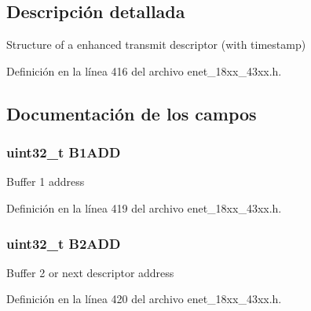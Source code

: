\subsection{Descripción detallada}
Structure of a enhanced transmit descriptor (with timestamp) 

Definición en la línea 416 del archivo enet\+\_\+18xx\+\_\+43xx.\+h.



\subsection{Documentación de los campos}
\subsubsection[{\texorpdfstring{B1\+A\+DD}{B1ADD}}]{ uint32\+\_\+t B1\+A\+DD}\hypertarget{struct_e_n_e_t___e_n_h_t_x_d_e_s_c___t_a9b99a80d13d854bce5c3f9646964c34e}{}\label{struct_e_n_e_t___e_n_h_t_x_d_e_s_c___t_a9b99a80d13d854bce5c3f9646964c34e}
Buffer 1 address 

Definición en la línea 419 del archivo enet\+\_\+18xx\+\_\+43xx.\+h.

\subsubsection[{\texorpdfstring{B2\+A\+DD}{B2ADD}}]{ uint32\+\_\+t B2\+A\+DD}\hypertarget{struct_e_n_e_t___e_n_h_t_x_d_e_s_c___t_a3cf5d995cea5c3b42b9224871c5b18a1}{}\label{struct_e_n_e_t___e_n_h_t_x_d_e_s_c___t_a3cf5d995cea5c3b42b9224871c5b18a1}
Buffer 2 or next descriptor address 

Definición en la línea 420 del archivo enet\+\_\+18xx\+\_\+43xx.\+h.

